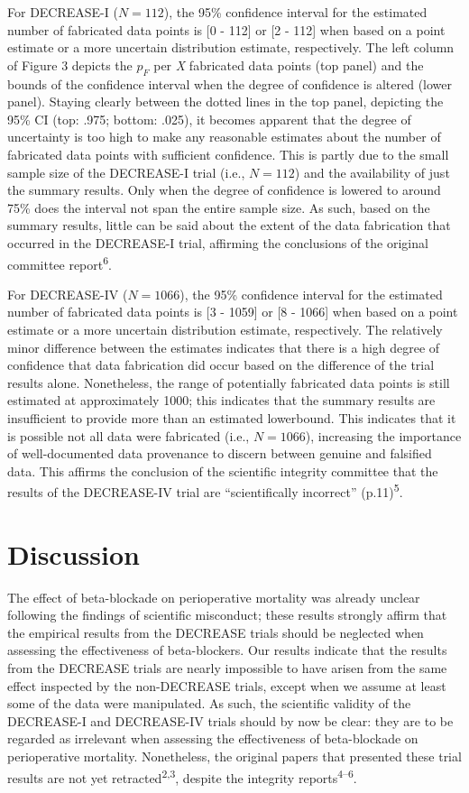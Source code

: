 \documentclass[]{article}
\begin{document}
For DECREASE-I (\(N=112\)), the 95\% confidence interval for the
estimated number of fabricated data points is {[}0 - 112{]} or {[}2 -
112{]} when based on a point estimate or a more uncertain distribution
estimate, respectively. The left column of Figure 3 depicts the \(p_F\)
per \emph{X} fabricated data points (top panel) and the bounds of the
confidence interval when the degree of confidence is altered (lower
panel). Staying clearly between the dotted lines in the top panel,
depicting the 95\% CI (top: .975; bottom: .025), it becomes apparent
that the degree of uncertainty is too high to make any reasonable
estimates about the number of fabricated data points with sufficient
confidence. This is partly due to the small sample size of the
DECREASE-I trial (i.e., \(N=112\)) and the availability of just the
summary results. Only when the degree of confidence is lowered to around
75\% does the interval not span the entire sample size. As such, based
on the summary results, little can be said about the extent of the data
fabrication that occurred in the DECREASE-I trial, affirming the
conclusions of the original committee report\textsuperscript{6}.

For DECREASE-IV (\(N=1066\)), the 95\% confidence interval for the
estimated number of fabricated data points is {[}3 - 1059{]} or {[}8 -
1066{]} when based on a point estimate or a more uncertain distribution
estimate, respectively. The relatively minor difference between the
estimates indicates that there is a high degree of confidence that data
fabrication did occur based on the difference of the trial results
alone. Nonetheless, the range of potentially fabricated data points is
still estimated at approximately 1000; this indicates that the summary
results are insufficient to provide more than an estimated lowerbound.
This indicates that it is possible not all data were fabricated (i.e.,
\(N=1066\)), increasing the importance of well-documented data
provenance to discern between genuine and falsified data. This affirms
the conclusion of the scientific integrity committee that the results of
the DECREASE-IV trial are ``scientifically incorrect''
(p.11)\textsuperscript{5}.

\section{Discussion}\label{discussion}

The effect of beta-blockade on perioperative mortality was already
unclear following the findings of scientific misconduct; these results
strongly affirm that the empirical results from the DECREASE trials
should be neglected when assessing the effectiveness of beta-blockers.
Our results indicate that the results from the DECREASE trials are
nearly impossible to have arisen from the same effect inspected by the
non-DECREASE trials, except when we assume at least some of the data
were manipulated. As such, the scientific validity of the DECREASE-I and
DECREASE-IV trials should by now be clear: they are to be regarded as
irrelevant when assessing the effectiveness of beta-blockade on
perioperative mortality. Nonetheless, the original papers that presented
these trial results are not yet retracted\textsuperscript{2,3}, despite
the integrity reports\textsuperscript{4--6}.
\end{document}
